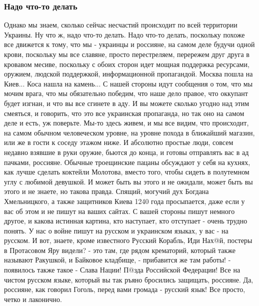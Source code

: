  
 
 
 
 

\subsubsection{Надо что-то делать}

Однако мы знаем, сколько сейчас несчастий происходит по всей территории
Украины. Ну что ж, надо что-то делать. Надо что-то делать, поскольку похоже все
движется к тому, что мы - украинцы и россияне, на самом деле будучи одной
крови, поскольку мы все славяне, просто перестреляем, перережем друг друга в
кровавом месиве, поскольку с обоих сторон идет мощная поддержка ресурсами,
оружием, людской поддержкой, информационной пропагандой. Москва пошла на
Киев... Коса нашла на камень... С нашей стороны идут сообщения о том, что мы
мочим врага, что мы обязательно победим, что наше дело правое, что оккупант
будет изгнан, и что вы все сгинете в аду. И вы можете сколько угодно над этим
смеяться, и говорить, что это все украинская пропаганда, но так оно на самом
деле и есть, уж поверьте.  Мы-то здесь живем, и мы все видим, что происходит,
на самом обычном человеческом уровне, на уровне похода в ближайший магазин, или
же в гости к соседу этажом ниже. И абсолютно простые люди, совсем недавно
взявшие в руки оружие, бьются до конца, и готовы отправлять вас в ад пачками,
россияне.  Обычные троещинские пацаны обсуждают у себя на кухнях, как лучше
сделать коктейли Молотова, вместо того, чтобы сидеть в полутемном углу с
любимой девушкой. И может быть вы этого и не ожидали, может быть вы этого и не
знаете, но такова правда.  Спящий, могучий дух Богдана Хмельницкого, а также
защитников Киева 1240 года просыпается, даже если у вас об этом и не пишут на
ваших сайтах. С вашей стороны пишут немного другое, и какова истинная картина,
кто наступает, кто отступает - очень трудно понять.  У нас о войне пишут на
русском и украинском языках, у вас - на русском. И вот, знаете, кроме
известного Русский Корабль, Иди Нах@й, постеры в Протасовом Яру видели? - это
там, где рядом крематорий, который также называют Ракушкой, и Байковое
кладбище, - прибавится же там работы! - появилось также такое - Слава Нации!
П@зда Российской Федерации! Все на чистом русском языке, который вы так ръяно
бросились защищать, россияне. Да, россияне, как говорил Гоголь, перед вами
громада - русский язык!  Все просто, четко и лаконично.

